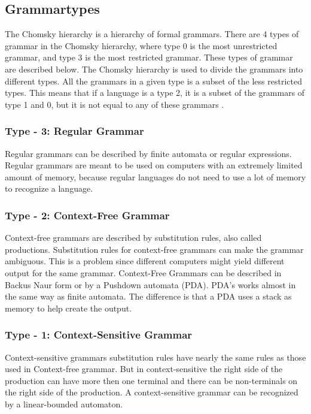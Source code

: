 \subsection{Grammartypes}
The Chomsky hierarchy is a hierarchy of formal grammars. There are 4 types of grammar in the Chomsky hierarchy, where type 0 is the most unrestricted grammar, and type 3 is the most restricted grammar. These types of grammar are described below. The Chomsky hierarchy is used to divide the grammars into different types. All the grammars in a given type is a subset of the less restricted types. This means that if a language is a type 2, it is a subset of the grammars of type 1 and 0, but it is not equal to any of these grammars \citep{Chomsky}.

\subsubsection{Type - 3: Regular Grammar}
Regular grammars can be described by finite automata or regular expressions. Regular grammars are meant to be used on computers with an extremely limited amount of memory, because regular languages do not need to use a lot of memory to recognize a language\citep{sipser}.

\subsubsection{Type - 2: Context-Free Grammar}
Context-free grammars are described by substitution rules, also called productions. Substitution rules for context-free grammars can make the grammar ambiguous.
This is a problem since different computers might yield different output for the same grammar.
Context-Free Grammars can be described in Backus Naur form or by a Pushdown automata (PDA). PDA's works almost in the same way as finite automata. The difference is that a PDA uses a stack as memory to help create the output\citep{sipser}. 

\subsubsection{Type - 1: Context-Sensitive Grammar}
Context-sensitive grammars substitution rules have nearly the same rules as those used in Context-free grammar. But in context-sensitive the right side of the production can have more then one terminal and there can be non-terminals on the right side of the production. A context-sensitive grammar can be recognized by a linear-bounded automaton.


